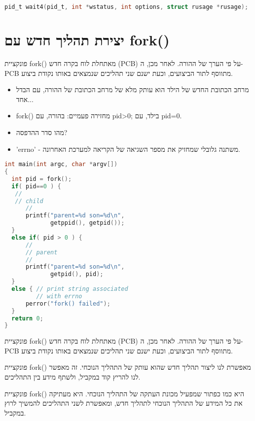 \documentclass[12pt]{report}
\begin{document}
  \begin{lstlisting}[language=C]  pid_t wait4(pid_t, int *wstatus, int options, struct rusage *rusage);  \end{lstlisting}  

\section{יצירת תהליך חדש עם fork()} 
 פונקציית fork() מאתחלת לוח בקרה חדש (PCB) על פי הערך של ההורה. לאחר מכן, ה-PCB מתווסף לתור הביצועים, וכעת ישנם שני תהליכים שנמצאים באותו נקודת ביצוע. 

 \begin{itemize} 
 \item מרחב הכתובת החדש של הילד הוא עותק מלא של מרחב הכתובת של ההורה, עם הבדל אחד... 
 \item fork() מחזירה פעמיים: בהורה, עם pid>0; בילד, עם pid=0. 
 \item מהו סדר ההדפסה? 
 \item 'errno' - משתנה גלובלי שמחזיק את מספר השגיאה של הקריאה למערכת האחרונה. 
 \end{itemize}
\begin{lstlisting}[language=C] 
int main(int argc, char *argv[]) 
{ 
  int pid = fork(); 
  if( pid==0 ) { 
   // 
   // child 
      // 
      printf("parent=%d son=%d\n", 
             getppid(), getpid()); 
  } 
  else if( pid > 0 ) { 
      // 
      // parent 
      // 
      printf("parent=%d son=%d\n", 
             getpid(), pid); 
  } 
  else { // print string associated 
         // with errno   
      perror("fork() failed");  
  } 
  return 0; 
} 
\end{lstlisting}
\begin{tcolorbox}[colback=yellow!5, colframe=yellow!80!black, title={\faBookmark נקודות מפתח}] 
פונקציית fork() מאתחלת לוח בקרה חדש (PCB) על פי הערך של ההורה. לאחר מכן, ה-PCB מתווסף לתור הביצועים, וכעת ישנם שני תהליכים שנמצאים באותו נקודת ביצוע. 
\end{tcolorbox}
\begin{tcolorbox}[colback=green!5, colframe=green!75!black, title={\faLightbulb אינטואיציה}] 
פונקציית fork() מאפשרת לנו ליצור תהליך חדש שהוא עותק של התהליך הנוכחי. זה מאפשר לנו להריץ קוד במקביל, ולשתף מידע בין התהליכים. 
\end{tcolorbox}
\begin{tcolorbox}[colback=blue!5, colframe=blue!75!black, title={\faLightbulb הסבר פשוט}] 
פונקציית fork() היא כמו כפתור שמפעיל מכונת העתקה של התהליך הנוכחי. היא מעתיקה את כל המידע של התהליך הנוכחי לתהליך חדש, ומאפשרת לשני התהליכים להמשיך לרוץ במקביל. 
\end{tcolorbox}
\end{document}
